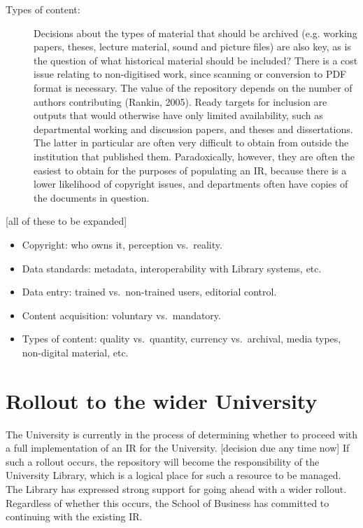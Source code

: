 \documentclass[12pt,pdftex,a4paper,titlepage]{article}
\begin{document}
\begin{description}
	\item[Types of content:] Decisions about the types of material that should be archived (e.g. working papers, theses, lecture material, sound and picture files) are also key, as is the question of what historical material should be included? There is a cost issue relating to non-digitised work, since scanning or conversion to PDF format is necessary. The value of the repository depends on the number of authors contributing (Rankin, 2005). Ready targets for inclusion are outputs that would otherwise have only limited availability, such as departmental working and discussion papers, and theses and dissertations. The latter in particular are often very difficult to obtain from outside the institution that published them. Paradoxically, however, they are often the easiest to obtain for the purposes of populating an IR, because there is a lower likelihood of copyright issues, and departments often have copies of the documents in question.

\end{description}


[all of these to be expanded]

\begin{itemize}

	\item Copyright: who owns it, perception vs.\ reality.

	\item Data standards: metadata, interoperability with Library systems, etc.

	\item Data entry: trained vs.\ non-trained users, editorial control.

	\item Content acquisition: voluntary vs.\ mandatory.

	\item Types of content: quality vs.\ quantity, currency vs.\ archival, media types, non-digital material, etc.

\end{itemize}


\section{Rollout to the wider University}

The University is currently in the process of determining whether to proceed with a full implementation of an IR for the University. [decision due any time now] If such a rollout occurs, the repository will become the responsibility of the University Library, which is a logical place for such a resource to be managed. The Library has expressed strong support for going ahead with a wider rollout. Regardless of whether this occurs, the School of Business has committed to continuing with the existing IR.
\end{document}
